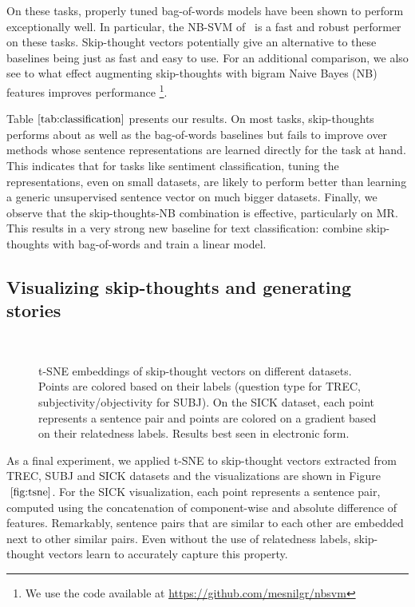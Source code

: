 \documentclass{article} \usepackage{nips15submit_e,times}
\begin{document}
On these tasks, properly tuned bag-of-words models have been shown to perform exceptionally well. In particular, the NB-SVM of~\cite{wang2012baselines} is a fast and robust performer on these tasks. Skip-thought vectors potentially give an alternative to these baselines being just as fast and easy to use. For an additional comparison, we also see to what effect augmenting skip-thoughts with bigram Naive Bayes (NB) features improves performance \footnote{We use the code available at \url{https://github.com/mesnilgr/nbsvm}}.


Table$~\ref{tab:classification}$ presents our results. On most tasks, skip-thoughts performs about as well as the bag-of-words baselines but fails to improve over methods whose sentence representations are learned directly for the task at hand. This indicates that for tasks like sentiment classification, tuning the representations, even on small datasets, are likely to perform better than learning a generic unsupervised sentence vector on much bigger datasets. Finally, we observe that the skip-thoughts-NB combination is effective, particularly on MR. This results in a very strong new baseline for text classification: combine skip-thoughts with bag-of-words and train a linear model.


\subsection{Visualizing skip-thoughts and generating stories}

\begin{figure}[t]
\vspace{-3mm}
  \centering
  \mbox{
    \quad
   \label{fig:tsne}
  }
  \vspace{-4mm}
  \caption{t-SNE embeddings of skip-thought vectors on different datasets. Points are colored based on their labels (question type for TREC, subjectivity/objectivity for SUBJ). On the SICK dataset, each point represents a sentence pair and points are colored on a gradient based on their relatedness labels. Results best seen in electronic form.}
  \vspace{-1mm}
\label{fig:tsne}
\end{figure}


As a final experiment, we applied t-SNE \cite{van2008visualizing} to skip-thought vectors extracted from TREC, SUBJ and SICK datasets and the visualizations are shown in Figure $~\ref{fig:tsne}$. For the SICK visualization, each point represents a sentence pair, computed using the concatenation of component-wise and absolute difference of features. Remarkably, sentence pairs that are similar to each other are embedded next to other similar pairs. Even without the use of relatedness labels, skip-thought vectors learn to accurately capture this property.
\end{document}
